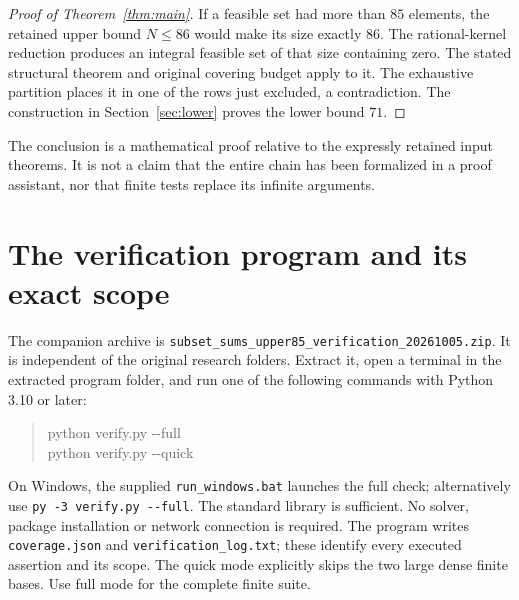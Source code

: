 \documentclass[11pt,letterpaper]{article}
\theoremstyle{definition}\newtheorem{definition}[theorem]{Definition}
\begin{document}
\begin{proof}[Proof of Theorem~\ref{thm:main}]
If a feasible set had more than $85$ elements, the retained upper bound $N\le86$ would make its size exactly $86$. The rational-kernel reduction produces an integral feasible set of that size containing zero. The stated structural theorem and original covering budget apply to it. The exhaustive partition places it in one of the rows just excluded, a contradiction. The construction in Section~\ref{sec:lower} proves the lower bound $71$.
\end{proof}
The conclusion is a mathematical proof relative to the expressly retained input theorems. It is not a claim that the entire chain has been formalized in a proof assistant, nor that finite tests replace its infinite arguments.



\section{The verification program and its exact scope}\label{app:verification}
The companion archive is \texttt{subset\_sums\_upper85\_verification\_20261005.zip}. It is independent of the original research folders. Extract it, open a terminal in the extracted program folder, and run one of the following commands with Python 3.10 or later:
\begin{quote}\ttfamily
python verify.py -{}-full\\
python verify.py -{}-quick
\end{quote}
On Windows, the supplied \texttt{run\_windows.bat} launches the full check; alternatively use \texttt{py -3 verify.py -{}-full}. The standard library is sufficient. No solver, package installation or network connection is required. The program writes \texttt{coverage.json} and \texttt{verification\_log.txt}; these identify every executed assertion and its scope. The quick mode explicitly skips the two large dense finite bases. Use full mode for the complete finite suite.
\end{document}
